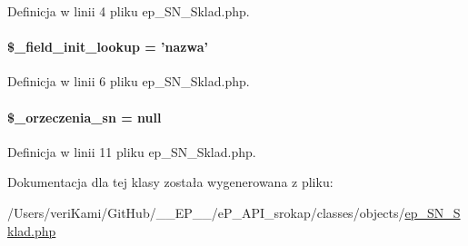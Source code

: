 Definicja w linii 4 pliku ep\-\_\-\-S\-N\-\_\-\-Sklad.\-php.

\hypertarget{classep___s_n___sklad_a4a4d54ae35428077a7c61ec8a5139af3}{
\paragraph[{\$\-\_\-field\-\_\-init\-\_\-lookup}]{\setlength{\rightskip}{0pt plus 5cm}\$\-\_\-field\-\_\-init\-\_\-lookup = 'nazwa'}}\label{classep___s_n___sklad_a4a4d54ae35428077a7c61ec8a5139af3}


Definicja w linii 6 pliku ep\-\_\-\-S\-N\-\_\-\-Sklad.\-php.

\hypertarget{classep___s_n___sklad_a6f02468de85c0d4fa4f284d88f064662}{
\paragraph[{\$\-\_\-orzeczenia\-\_\-sn}]{\setlength{\rightskip}{0pt plus 5cm}\$\-\_\-orzeczenia\-\_\-sn = null\hspace{0.3cm}{\ttfamily [protected]}}}\label{classep___s_n___sklad_a6f02468de85c0d4fa4f284d88f064662}


Definicja w linii 11 pliku ep\-\_\-\-S\-N\-\_\-\-Sklad.\-php.



Dokumentacja dla tej klasy została wygenerowana z pliku\-:\begin{DoxyCompactItemize}
\item 
/\-Users/veri\-Kami/\-Git\-Hub/\-\_\-\-\_\-\-E\-P\-\_\-\-\_\-/e\-P\-\_\-\-A\-P\-I\-\_\-srokap/classes/objects/\hyperlink{ep___s_n___sklad_8php}{ep\-\_\-\-S\-N\-\_\-\-Sklad.\-php}\end{DoxyCompactItemize}
